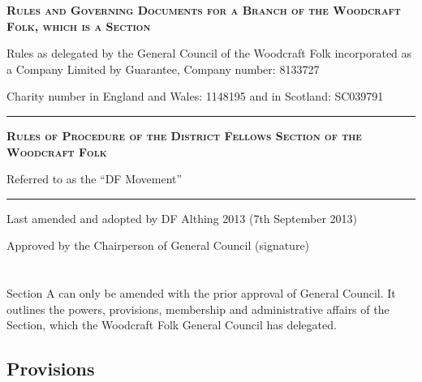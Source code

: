 \documentclass[a4paper, 11pt]{report}
\newcommand{\HRule}{\rule{\linewidth}{0.5mm}}
\begin{document}
\begin{titlepage}
\begin{center}

\doublespacing
\vspace*{1cm}

\textsc{\textbf{ \LARGE Rules and Governing Documents for a Branch of the Woodcraft Folk, which is a Section }}

\vspace{1cm}

Rules as delegated by the General Council of the Woodcraft Folk incorporated as a Company Limited by Guarantee, Company number: 8133727

Charity number in England and Wales: 1148195 and in Scotland: SC039791

\vspace{1cm}

\HRule

\vspace{1.5cm}

\textsc{\textbf{\Large Rules of Procedure of the District Fellows Section of the Woodcraft Folk }}

Referred to as the ``DF Movement''

\vspace{1.5cm}

\HRule

\vspace{2cm}

Last amended and adopted by DF Althing 2013 (7th September 2013)

\vspace{0.5cm}

Approved by the Chairperson of General Council (signature) \underline{ \hspace{5cm} }

\end{center}
\end{titlepage}

\tableofcontents

\renewcommand{\chaptername}{Section}
\chapter{}
Section A can only be amended with the prior approval of General Council. It outlines the powers, provisions, membership and administrative affairs of the Section, which the Woodcraft Folk General Council has delegated.

\section{Provisions}
\label{sec:provisions}
\end{document}
